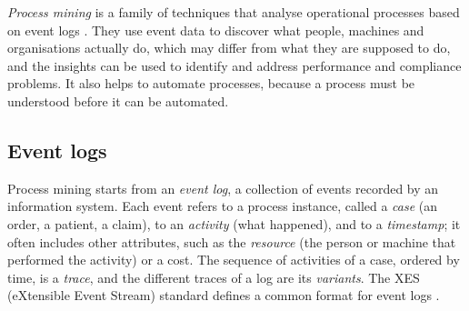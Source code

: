 \emph{Process mining} is a family of techniques that analyse operational processes based on event logs
\citep{vanderaalst2012process,vanderaalst2016process}. They use event data to discover what people,
machines and organisations actually do, which may differ from what they are supposed to do, and the
insights can be used to identify and address performance and compliance problems. It also helps to automate processes, because a process must be understood before it can be automated.

\subsection{Event logs}

Process mining starts from an \emph{event log}, a collection of events recorded by an information
system. Each event refers to a process instance, called a \emph{case} (an order, a patient, a claim), to
an \emph{activity} (what happened), and to a \emph{timestamp}; it often includes other attributes, such
as the \emph{resource} (the person or machine that performed the activity) or a cost. The sequence of
activities of a case, ordered by time, is a \emph{trace}, and the different traces of a log are its
\emph{variants}. The XES (eXtensible Event Stream) standard defines a common format for event logs \citep{ieee2016xes}.

